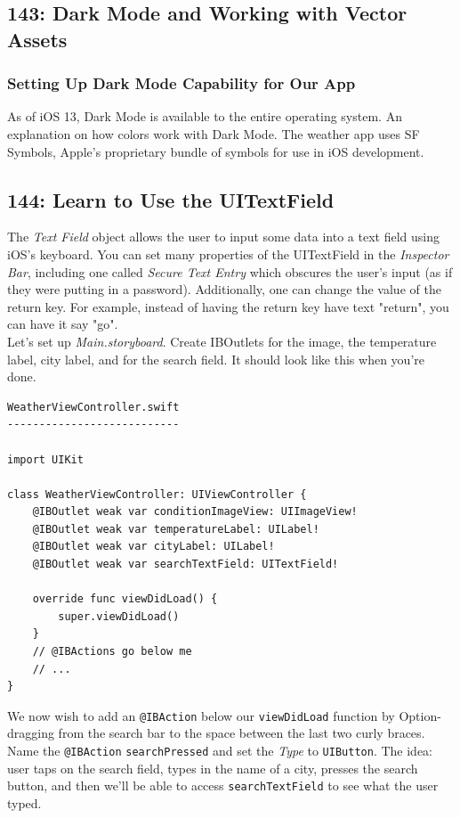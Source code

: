 \documentclass[11pt, letterpaper]{article}
\begin{document}
\subsection*{143: Dark Mode and Working with Vector Assets}

\subsubsection*{Setting Up Dark Mode Capability for Our App}

As of iOS 13, Dark Mode is available to the entire operating system. An explanation on how colors work with Dark Mode.
The weather app uses SF Symbols, Apple's proprietary bundle of symbols for use in iOS development. \\

\subsection*{144: Learn to Use the UITextField}

The \emph{Text Field} object allows the user to input some data into a text field using iOS's keyboard. You can set many
properties of the UITextField in the \emph{Inspector Bar}, including one called \emph{Secure Text Entry} which obscures
the user's input (as if they were putting in a password). Additionally, one can change the value of the return key.
For example, instead of having the return key have text "return", you can have it say "go".\\

Let's set up \emph{Main.storyboard}. Create IBOutlets for the image, the temperature label, city label, and for the search
field. It should look like this when you're done.

\begin{verbatim}
WeatherViewController.swift
---------------------------

import UIKit

class WeatherViewController: UIViewController {
    @IBOutlet weak var conditionImageView: UIImageView!
    @IBOutlet weak var temperatureLabel: UILabel!
    @IBOutlet weak var cityLabel: UILabel!
    @IBOutlet weak var searchTextField: UITextField!

    override func viewDidLoad() {
        super.viewDidLoad()
    }
    // @IBActions go below me
    // ...
}
\end{verbatim}

We now wish to add an \verb+@IBAction+ below our \verb+viewDidLoad+ function by Option-dragging from the search bar to the space
between the last two curly braces. Name the \verb+@IBAction+ \verb+searchPressed+ and set the \emph{Type} to \verb+UIButton+.
The idea: user taps on the search field, types in the name of a city, presses the search button, and then we'll be able
to access \verb+searchTextField+ to see what the user typed. \\
\end{document}
